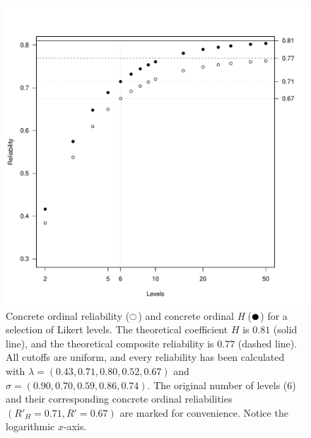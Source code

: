 \documentclass[twoside]{article}
\begin{document}
\begin{figure}
\noindent \begin{centering}
\includegraphics[scale=0.5]{chunks/ordinals}
\par\end{centering}
\caption{\label{fig:Ordinal reliability}Concrete ordinal reliability ($\fullmoon$)
and concrete ordinal \textit{H} ($\newmoon$) for a selection of Likert levels. The
theoretical coefficient $H$ is $0.81$ (solid line), and the theoretical
composite reliability is $0.77$ (dashed line). All cutoffs are uniform,
and every reliability has been calculated with $\lambda=(0.43,0.71,0.80,0.52,0.67)$
and $\sigma=(0.90,0.70,0.59,0.86,0.74)$. The original number of levels
($6$) and their corresponding concrete ordinal reliabilities $( R'_{H}=0.71, R'=0.67)$
are marked for convenience. Notice the logarithmic $x$-axis.}
\end{figure}
\end{document}
